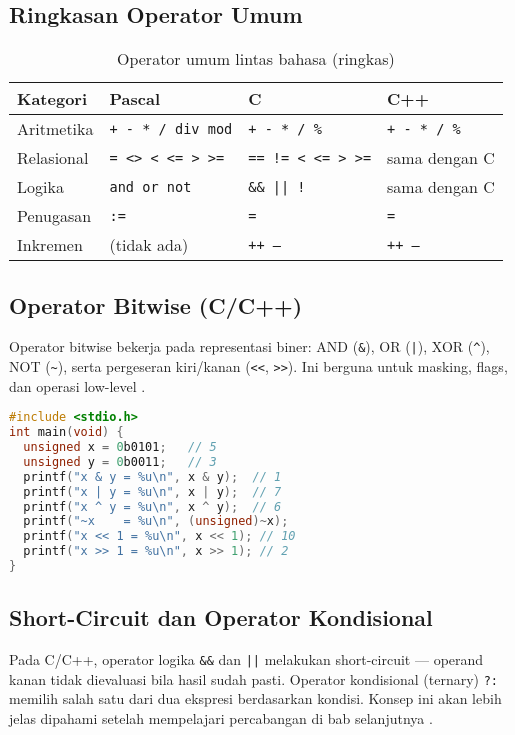 \documentclass[../main.tex]{subfiles}
\begin{document}
\subsection{Ringkasan Operator Umum}
\begin{table}[H]
  \centering
  \caption{Operator umum lintas bahasa (ringkas)}
  \begin{tabular}{@{}llll@{}}
    \toprule
    Kategori & Pascal & C & C++ \\
    \midrule
    Aritmetika & \texttt{+ - * / div mod} & \texttt{+ - * / \%} & \texttt{+ - * / \%} \\
    Relasional & \texttt{= {\textless}{\textgreater} {\textless} {\textless}= {\textgreater} {\textgreater}=} & \texttt{== != {\textless} {\textless}= {\textgreater} {\textgreater}=} & sama dengan C \\
    Logika & \texttt{and or not} & \texttt{\&\& || !} & sama dengan C \\
    Penugasan & \texttt{:=} & \texttt{=} & \texttt{=} \\
    Inkremen & (tidak ada) & \texttt{++ --} & \texttt{++ --} \\
    \bottomrule
  \end{tabular}
\end{table}

\subsection{Operator Bitwise (C/C++)}
Operator bitwise bekerja pada representasi biner: AND (\texttt{\&}), OR (\texttt{|}), XOR (\texttt{\^{}}), NOT (\texttt{\textasciitilde}), serta pergeseran kiri/kanan (\texttt{<<}, \texttt{>>}). Ini berguna untuk masking, flags, dan operasi low-level \parencite{c-bitwise-ops,cpp-bitwise-ops}.

\begin{lstlisting}[language=C, caption={Contoh operator bitwise di C}]
#include <stdio.h>
int main(void) {
  unsigned x = 0b0101;   // 5
  unsigned y = 0b0011;   // 3
  printf("x & y = %u\n", x & y);  // 1
  printf("x | y = %u\n", x | y);  // 7
  printf("x ^ y = %u\n", x ^ y);  // 6
  printf("~x    = %u\n", (unsigned)~x);
  printf("x << 1 = %u\n", x << 1); // 10
  printf("x >> 1 = %u\n", x >> 1); // 2
}
\end{lstlisting}

\subsection{Short-Circuit dan Operator Kondisional}
Pada C/C++, operator logika \texttt{\&\&} dan \texttt{||} melakukan short-circuit — operand kanan tidak dievaluasi bila hasil sudah pasti. Operator kondisional (ternary) \texttt{?:} memilih salah satu dari dua ekspresi berdasarkan kondisi. Konsep ini akan lebih jelas dipahami setelah mempelajari percabangan di bab selanjutnya \parencite{c-conditional-operator,cpp-conditional-operator}.
\end{document}
